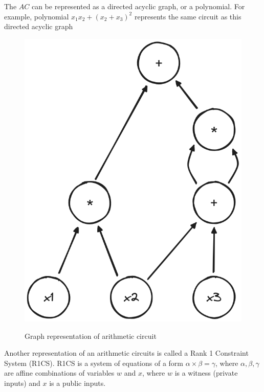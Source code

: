 \documentclass[conference,comsoc,10pt]{IEEEtran}
\begin{document}
        The $AC$ can be represented as a directed acyclic graph, or a polynomial. For
        example, polynomial $x_1x_2 + (x_2 + x_3)^2$ represents the same circuit as this
        directed acyclic graph

        \begin{figure}[h]
            \centering
            \includegraphics[scale=0.3]{../bachelor/assets/images/dag_example.png}
            \caption{Graph representation of arithmetic circuit}
            \label{fig:dag_example}
            \cite{youtuMOOCLecture3}
            \vspace{0.5cm}
        \end{figure}

        Another representation of an arithmetic circuits is called a Rank 1 Constraint
        System (R1CS). R1CS is a system of equations of a form $\alpha \times \beta = \gamma$,
        where $\alpha, \beta, \gamma$ are affine combinations of variables $w$ and $x$,
        where $w$ is a witness (private inputs) and $x$ is a public inputs.
\end{document}
